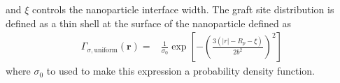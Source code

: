 \documentclass{article}
\begin{document}
    and $\xi$ controls the nanoparticle interface width.
  The graft site distribution is defined as a thin shell at the surface of the
    nanoparticle defined as
  \begin{align}
    \Gamma_{\sigma,\text{uniform}}  (\mathbf{r}) =& 
    \frac{1}{\sigma_0} \exp 
    \left[ -
       \left(
        \frac{3(\vert r \vert - R_p - \xi) }
          {2b^2}
      \right)^2
    \right]
  \end{align}
  where $\sigma_0 $ to used to make this expression a probability density function. 
  
\end{document}
